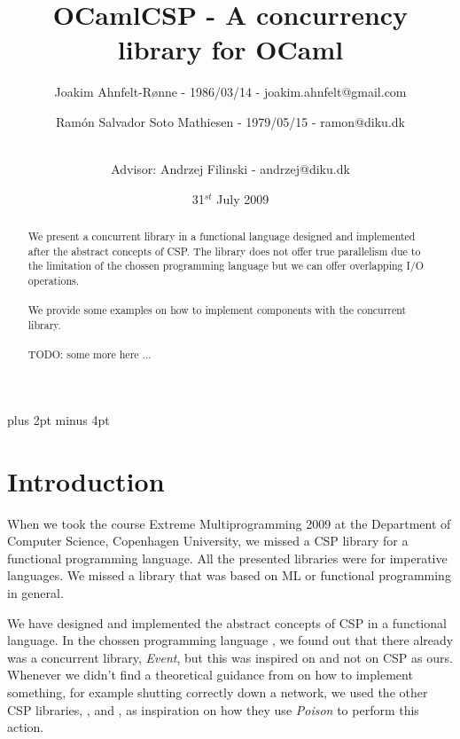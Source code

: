 \documentclass[a4paper,12pt]{article}
\title{OCamlCSP - A concurrency library for OCaml}
\author{Joakim Ahnfelt-Rønne - 1986/03/14 - joakim.ahnfelt@gmail.com \and 
        Ramón Salvador Soto Mathiesen - 1979/05/15 - ramon@diku.dk \and
        \\ Advisor: Andrzej Filinski - andrzej@diku.dk}
\date{31$^{st}$ July 2009}
\begin{document}
\maketitle

\newpage
{}
\begin{abstract}
We present a concurrent library in a functional language designed and
implemented after the abstract concepts of CSP\cite{hoare}. The library does
not offer true parallelism due to the limitation of the chossen programming
language but we can offer overlapping I/O operations.
\\ \\
We provide some examples on how to implement components with the concurrent
library.
\\ \\
TODO: some more here ...
\end{abstract}

\newpage
\setcounter{tocdepth}{2}
\setcounter{secttocdepth}{3}
\dosecttoc \tableofcontents
\newpage

\parindent=0pt
\parskip=8pt plus 2pt minus 4pt

\section{Introduction}
When we took the course Extreme Multiprogramming 2009 at the Department of
Computer Science, Copenhagen University, we missed a CSP\cite{hoare} library for
a functional programming language. All the presented libraries were for
imperative languages. We missed a library that was based on ML or functional
programming in general.

We have designed and implemented the abstract concepts of CSP in a functional
language. In the chossen programming language \cite{ocaml}, we found out
that there already was a concurrent library, {\it Event}, but this was inspired
on \cite{concurrentml} and not on CSP as ours. Whenever we didn't find a
theoretical guidance from \cite{hoare} on how to implement something, for
example shutting correctly down a network, we used the other CSP libraries,
\cite{pycsp}, \cite{jcsp} and \cite{cppcsp2}, as inspiration on how they use
{\it Poison} to perform this action.
\end{document}
